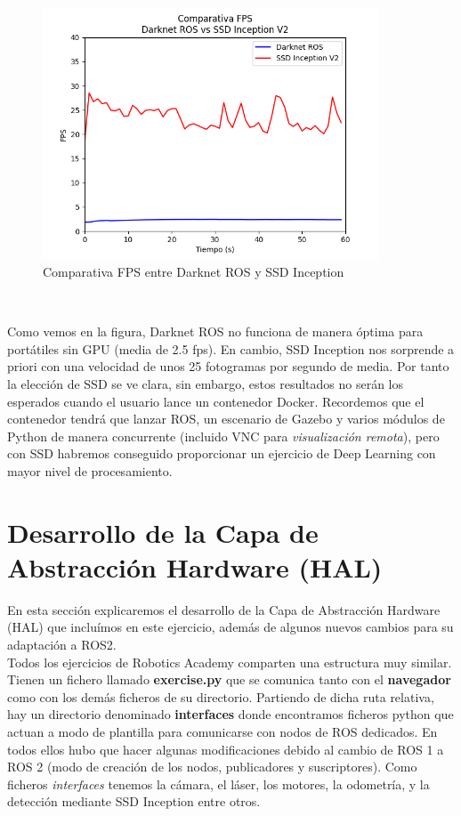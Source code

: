 \begin{figure} [H]
  \begin{center}
    \includegraphics[width=10cm]{imagenes/comparativa-fps-models.png}
  \end{center}
  \caption[Comparativa FPS entre Darknet ROS y SSD Inception]{Comparativa FPS entre Darknet ROS y SSD Inception}
  \label{fig:comparativa_fps_models}
\end{figure}\

Como vemos en la figura, Darknet ROS no funciona de manera óptima para portátiles sin GPU (media de 2.5 fps). En cambio, SSD Inception nos sorprende a priori con una velocidad de unos 25 fotogramas por segundo de media. Por tanto la elección de SSD se ve clara, sin embargo, estos resultados no serán los esperados cuando el usuario lance un contenedor Docker. Recordemos que el contenedor tendrá que lanzar ROS, un escenario de Gazebo y varios módulos de Python de manera concurrente (incluido VNC para \textit{visualización remota}), pero con SSD habremos conseguido proporcionar un ejercicio de Deep Learning con mayor nivel de procesamiento.\\




\section{Desarrollo de la Capa de Abstracción Hardware (HAL)}
\label{sec:hal_sim_follow_person}

En esta sección explicaremos el desarrollo de la Capa de Abstracción Hardware (HAL) que incluímos en este ejercicio, además de algunos nuevos cambios para su adaptación a ROS2.\\

Todos los ejercicios de Robotics Academy comparten una estructura muy similar. Tienen un fichero llamado \textbf{exercise.py} que se comunica tanto con el \textbf{navegador} como con los demás ficheros de su directorio. Partiendo de dicha ruta relativa, hay un directorio denominado \textbf{interfaces} donde encontramos ficheros python que actuan a modo de plantilla para comunicarse con nodos de ROS dedicados. En todos ellos hubo que hacer algunas modificaciones debido al cambio de ROS 1 a ROS 2 (modo de creación de los nodos, publicadores y suscriptores). Como ficheros \textit{interfaces} tenemos la cámara, el láser, los motores, la odometría, y la detección mediante SSD Inception entre otros.\\

